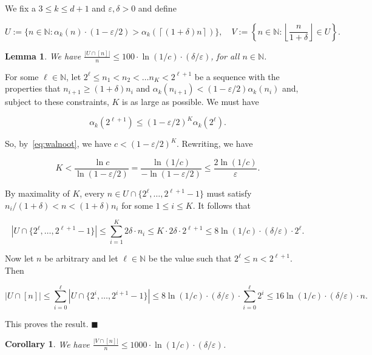 \documentclass[11pt]{article}%
\newenvironment{proof}{\vspace{1ex}\noindent{\bf Proof.}}{\hspace*{\fill}$\blacksquare$\vspace{1ex}}
\newtheorem{lemma}[lemma]{Lemma}
\newtheorem{corollary}[corollary]{Corollary}
\newcommand{\eN}[0]{\ensuremath{ \mathbb N}}
\newcommand{\eps}{\varepsilon}
\begin{document}
We fix a $3\leq k \leq d+1$ and $\eps,\delta > 0$ and define

\begin{equation}\label{eq:UVdef} 
U := \Big\{ n \in \eN : \alpha_k(n) \cdot (1-\eps/2) > \alpha_k\left( \left\lceil (1+\delta) n\right\rceil\right) \Big\}, 
\quad V := \left\{ n \in \eN : \left\lfloor\frac{n}{1+\delta}\right\rfloor \in U \right\}. 
\end{equation}

\begin{lemma}
We have $\displaystyle \frac{|U \cap [n]|}{n} \leq 100 \cdot \ln(1/c) \cdot (\delta/\eps)$, for all $n \in \eN$.
\end{lemma}

\begin{proof}
For some $\ell \in \eN$, let $2^\ell \leq n_1 < n_2 < \dots n_K < 2^{\ell+1}$ be a 
sequence with the properties that $n_{i+1} \geq (1+\delta)n_i$ and 
$\alpha_k( n_{i+1} ) < (1-\eps/2) \alpha_k(n_i)$ and, subject to these constraints, $K$ is 
as large as possible.
We must have 

$$ \alpha_k( 2^{\ell+1} ) \leq (1-\eps/2)^K \alpha_k(2^\ell). $$

\noindent
So, by~\eqref{eq:walnoot}, we have $c < (1-\eps/2)^K$. Rewriting, we have

$$ K < \frac{\ln c}{\ln(1-\eps/2)} = \frac{\ln(1/c)}{-\ln(1-\eps/2)} \leq \frac{2\ln(1/c)}{\eps}. $$

\noindent
By maximality of $K$, every $n \in U \cap \{2^\ell, \dots, 2^{\ell+1}-1\}$ must satisfy 
$n_i/(1+\delta) < n < (1+\delta)n_i$ for some $1\leq i \leq K$.
It follows that 

$$ \left| U \cap \{2^\ell, \dots, 2^{\ell+1}-1\} \right| \leq 
\sum_{i=1}^K 2\delta\cdot n_i \leq K \cdot 2\delta \cdot 2^{\ell+1}
\leq 8\ln(1/c) \cdot (\delta/\eps) \cdot 2^\ell. $$

Now let $n$ be arbitrary and let $\ell \in \eN$ be the value such that 
$2^\ell \leq n < 2^{\ell+1}$. 
Then 

$$ |U \cap [n]| \leq \sum_{i=0}^\ell |U \cap \{2^i, \dots, 2^{i+1}-1\}|
\leq 8\ln(1/c) \cdot (\delta/\eps) \cdot \sum_{i=0}^\ell 2^i 
\leq 16\ln(1/c) \cdot (\delta/\eps) \cdot n. $$

\noindent
This proves the result.
\end{proof}

\begin{corollary}
We have $\displaystyle \frac{|V \cap [n]|}{n} \leq 1000 \cdot \ln(1/c) \cdot (\delta/\eps)$.
\end{corollary}
\end{document}

